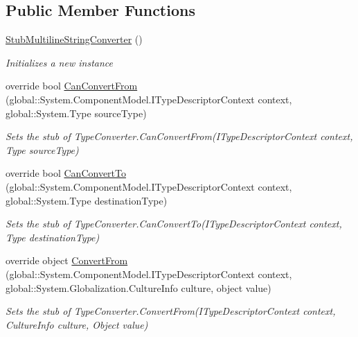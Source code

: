 \subsection*{Public Member Functions}
\begin{DoxyCompactItemize}
\item 
\hyperlink{class_system_1_1_component_model_1_1_fakes_1_1_stub_multiline_string_converter_aef684b2da4e11c690dc95f413d9530f9}{Stub\-Multiline\-String\-Converter} ()
\begin{DoxyCompactList}\small\item\em Initializes a new instance\end{DoxyCompactList}\item 
override bool \hyperlink{class_system_1_1_component_model_1_1_fakes_1_1_stub_multiline_string_converter_acb6c5f07b42a00dd7aa5b3cfd7b41bb3}{Can\-Convert\-From} (global\-::\-System.\-Component\-Model.\-I\-Type\-Descriptor\-Context context, global\-::\-System.\-Type source\-Type)
\begin{DoxyCompactList}\small\item\em Sets the stub of Type\-Converter.\-Can\-Convert\-From(\-I\-Type\-Descriptor\-Context context, Type source\-Type)\end{DoxyCompactList}\item 
override bool \hyperlink{class_system_1_1_component_model_1_1_fakes_1_1_stub_multiline_string_converter_aed02ff8f706ab6076a9af5548b27d59a}{Can\-Convert\-To} (global\-::\-System.\-Component\-Model.\-I\-Type\-Descriptor\-Context context, global\-::\-System.\-Type destination\-Type)
\begin{DoxyCompactList}\small\item\em Sets the stub of Type\-Converter.\-Can\-Convert\-To(\-I\-Type\-Descriptor\-Context context, Type destination\-Type)\end{DoxyCompactList}\item 
override object \hyperlink{class_system_1_1_component_model_1_1_fakes_1_1_stub_multiline_string_converter_a787efa43350da422269618375c970387}{Convert\-From} (global\-::\-System.\-Component\-Model.\-I\-Type\-Descriptor\-Context context, global\-::\-System.\-Globalization.\-Culture\-Info culture, object value)
\begin{DoxyCompactList}\small\item\em Sets the stub of Type\-Converter.\-Convert\-From(\-I\-Type\-Descriptor\-Context context, Culture\-Info culture, Object value)\end{DoxyCompactList}\item 

\end{DoxyCompactItemize}
